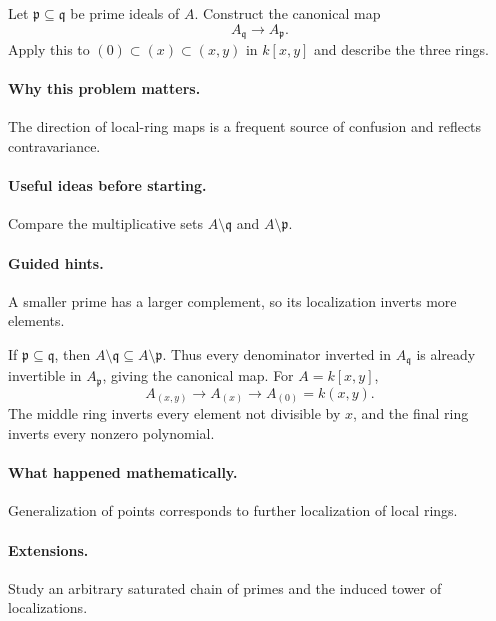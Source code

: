 \begin{problem}
Let $\mathfrak p\subseteq\mathfrak q$ be prime ideals of $A$.  Construct the canonical map
\[
A_{\mathfrak q}\longrightarrow A_{\mathfrak p}.
\]
Apply this to $(0)\subset(x)\subset(x,y)$ in $k[x,y]$ and describe the three rings.
\end{problem}

\paragraph{Why this problem matters.}
The direction of local-ring maps is a frequent source of confusion and reflects contravariance.

\paragraph{Useful ideas before starting.}
Compare the multiplicative sets $A\setminus\mathfrak q$ and $A\setminus\mathfrak p$.

\paragraph{Guided hints.}
A smaller prime has a larger complement, so its localization inverts more elements.

\begin{solution}
If $\mathfrak p\subseteq\mathfrak q$, then $A\setminus\mathfrak q\subseteq A\setminus\mathfrak p$.  Thus every denominator inverted in $A_{\mathfrak q}$ is already invertible in $A_{\mathfrak p}$, giving the canonical map.  For $A=k[x,y]$,
\[
A_{(x,y)}\to A_{(x)}\to A_{(0)}=k(x,y).
\]
The middle ring inverts every element not divisible by $x$, and the final ring inverts every nonzero polynomial.
\end{solution}

\paragraph{What happened mathematically.}
Generalization of points corresponds to further localization of local rings.

\paragraph{Extensions.}
Study an arbitrary saturated chain of primes and the induced tower of localizations.
